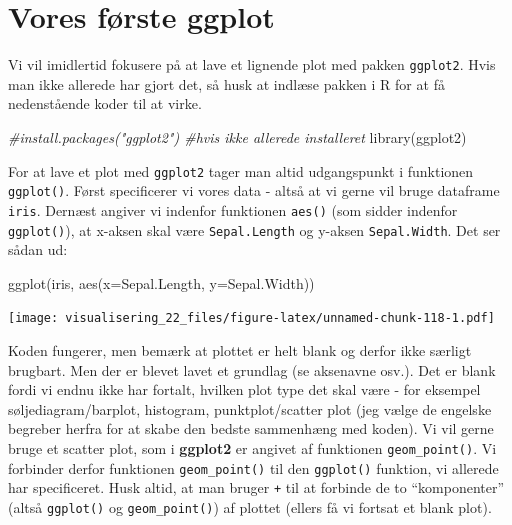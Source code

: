 \documentclass[
]{book}
\newenvironment{Shaded}{\begin{snugshade}}{\end{snugshade}}
\newcommand{\AttributeTok}[1]{\textcolor[rgb]{0.77,0.63,0.00}{#1}}
\newcommand{\CommentTok}[1]{\textcolor[rgb]{0.56,0.35,0.01}{\textit{#1}}}
\newcommand{\FunctionTok}[1]{\textcolor[rgb]{0.00,0.00,0.00}{#1}}
\newcommand{\NormalTok}[1]{#1}
\begin{document}
\hypertarget{vores-fuxf8rste-ggplot}{%
\section{Vores første ggplot}\label{vores-fuxf8rste-ggplot}}

Vi vil imidlertid fokusere på at lave et lignende plot med pakken \texttt{ggplot2}. Hvis man ikke allerede har gjort det, så husk at indlæse pakken i R for at få nedenstående koder til at virke.

\begin{Shaded}
\begin{Highlighting}[]
\CommentTok{\#install.packages("ggplot2") \#hvis ikke allerede installeret}
\FunctionTok{library}\NormalTok{(ggplot2)}
\end{Highlighting}
\end{Shaded}

For at lave et plot med \texttt{ggplot2} tager man altid udgangspunkt i funktionen \texttt{ggplot()}. Først specificerer vi vores data - altså at vi gerne vil bruge dataframe \texttt{iris}. Dernæst angiver vi indenfor funktionen \texttt{aes()} (som sidder indenfor \texttt{ggplot()}), at x-aksen skal være \texttt{Sepal.Length} og y-aksen \texttt{Sepal.Width}. Det ser sådan ud:

\begin{Shaded}
\begin{Highlighting}[]
\FunctionTok{ggplot}\NormalTok{(iris, }\FunctionTok{aes}\NormalTok{(}\AttributeTok{x=}\NormalTok{Sepal.Length, }\AttributeTok{y=}\NormalTok{Sepal.Width))}
\end{Highlighting}
\end{Shaded}

\texttt{[image: visualisering\_22\_files/figure-latex/unnamed-chunk-118-1.pdf]}

Koden fungerer, men bemærk at plottet er helt blank og derfor ikke særligt brugbart. Men der er blevet lavet et grundlag (se aksenavne osv.). Det er blank fordi vi endnu ikke har fortalt, hvilken plot type det skal være - for eksempel søljediagram/barplot, histogram, punktplot/scatter plot (jeg vælge de engelske begreber herfra for at skabe den bedste sammenhæng med koden). Vi vil gerne bruge et scatter plot, som i \textbf{ggplot2} er angivet af funktionen \texttt{geom\_point()}. Vi forbinder derfor funktionen \texttt{geom\_point()} til den \texttt{ggplot()} funktion, vi allerede har specificeret. Husk altid, at man bruger \texttt{+} til at forbinde de to ``komponenter'' (altså \texttt{ggplot()} og \texttt{geom\_point()}) af plottet (ellers få vi fortsat et blank plot).
\end{document}
